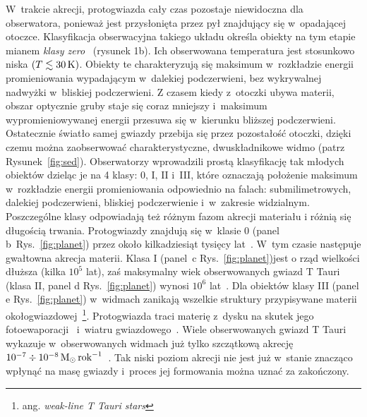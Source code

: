 W~trakcie akrecji, protogwiazda cały czas pozostaje niewidoczna dla obserwatora,
ponieważ jest przysłonięta przez pył znajdujący się w~opadającej otoczce.
Klasyfikacja obserwacyjna takiego układu określa obiekty na tym etapie mianem
\emph{klasy zero}~\cite{andre} (rysunek 1b). Ich obserwowana temperatura jest
stosunkowo niska $(T \lesssim 30\hbox{$\thinspace\textrm{K}$})$. Obiekty te charakteryzują się maksimum
w~rozkładzie energii promieniowania wypadającym w~dalekiej podczerwieni, bez
wykrywalnej nadwyżki w~bliskiej podczerwieni. Z czasem kiedy z~otoczki ubywa
materii, obszar optycznie gruby staje się coraz mniejszy i~maksimum
wypromieniowywanej energii przesuwa się w~kierunku bliższej podczerwieni.
Ostatecznie światło samej gwiazdy przebija się przez pozostałość otoczki, dzięki
czemu można zaobserwować charakterystyczne, dwuskładnikowe widmo (patrz
Rysunek~\ref{fig:sed}). Obserwatorzy wprowadzili prostą klasyfikację tak młodych
obiektów dzieląc je na 4 klasy: 0, I, II i~III, które oznaczają położenie
maksimum w~rozkładzie energii promieniowania odpowiednio na falach:
submilimetrowych, dalekiej podczerwieni, bliskiej podczerwienie i~w~zakresie
widzialnym. Poszczególne klasy odpowiadają też różnym fazom akrecji materiału i
różnią się długością trwania. Protogwiazdy znajdują się w~klasie 0 (panel
b~Rys.~\ref{fig:planet}) przez około
kilkadziesiąt tysięcy lat~\cite{FSSK06}. W~tym czasie następuje gwałtowna
akrecja materii.  Klasa I (panel~c Rys.~\ref{fig:planet})jest o rząd wielkości
dłuższa (kilka $10^5$ lat), zaś maksymalny wiek obserwowanych gwiazd T Tauri
(klasa II, panel d Rys.~\ref{fig:planet}) wynosi $10^6$ lat~\cite{HCGD98}.  Dla
obiektów klasy III (panel e Rys.~\ref{fig:planet}) w~widmach zanikają wszelkie
struktury przypisywane materii okołogwiazdowej~\footnote{ang. \emph{weak-line T
Tauri stars}}.  Protogwiazda traci materię z~dysku na skutek jego
fotoewaporacji~\cite{ACP06} i~wiatru gwiazdowego~\cite{PN86}. Wiele
obserwowanych gwiazd T Tauri wykazuje w~obserwowanych widmach już tylko
szczątkową akrecję $10^{-7} \div 10^{-8} \hbox{$\mathrm{\thinspace M_{\odot}}$}\hbox{$\thinspace\textrm{rok}$}^{-1}$~\cite{Hart98}. Tak
niski poziom akrecji nie jest już w~stanie znacząco wpłynąć na masę gwiazdy
i~proces jej formowania można uznać za zakończony.

